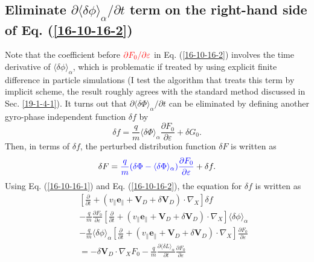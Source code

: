 \documentclass{llncs}
\newcommand{\tmcolor}[2]{{\color{#1}{#2}}}
\begin{document}
\subsection{Eliminate $\partial \langle \delta \phi \rangle_{\alpha} /
\partial t$ term on the right-hand side of Eq. (\ref{16-10-16-2})}

Note that the coefficient before $\tmcolor{red}{\partial F_0 / \partial
\varepsilon}$ in Eq. (\ref{16-10-16-2}) involves the time derivative of
$\langle \delta \phi \rangle_{\alpha}$, which is problematic if treated by
using explicit finite difference in particle simulations (I test the algorithm
that treats this term by implicit scheme, the result roughly agrees with the
standard method discussed in Sec. \ref{19-1-4-1}). It turns out that $\partial
\langle \delta \Phi \rangle_{\alpha} / \partial t$ can be eliminated by
defining another gyro-phase independent function $\delta f$ by
\begin{equation}
  \label{16-10-16-1} \delta f = \frac{q}{m} \langle \delta \Phi
  \rangle_{\alpha} \frac{\partial F_0}{\partial \varepsilon} + \delta G_0 .
\end{equation}
Then, in terms of $\delta f$, the perturbed distribution function $\delta F$
is written as
\begin{equation}
  \label{17-8-19-2} \delta F = \tmcolor{blue}{\frac{q}{m} (\delta \Phi -
  \langle \delta \Phi \rangle_{\alpha}) \frac{\partial F_0}{\partial
  \varepsilon}} + \delta f.
\end{equation}
Using Eq. (\ref{16-10-16-1}) and Eq. (\ref{16-10-16-2}), the equation for
$\delta f$ is written as
\begin{eqnarray}
  &  & \left[ \frac{\partial}{\partial t} + (v_{\parallel}
  \mathbf{e}_{\parallel} +\mathbf{V}_D + \delta \mathbf{V}_D) \cdot \nabla_X
  \right] \delta f \nonumber\\
  &  & - \frac{q}{m}  \frac{\partial F_0}{\partial \varepsilon} \left[
  \frac{\partial}{\partial t} + (v_{\parallel} \mathbf{e}_{\parallel}
  +\mathbf{V}_D + \delta \mathbf{V}_D) \cdot \nabla_X \right] \langle \delta
  \phi \rangle_{\alpha} \nonumber\\
  &  & - \frac{q}{m}  \langle \delta \phi \rangle_{\alpha} \left[
  \frac{\partial}{\partial t} + (v_{\parallel} \mathbf{e}_{\parallel}
  +\mathbf{V}_D + \delta \mathbf{V}_D) \cdot \nabla_X \right] \frac{\partial
  F_0}{\partial \varepsilon} \nonumber\\
  &  & = - \delta \mathbf{V}_D \cdot \nabla_X F_0 - \frac{q}{m} 
  \frac{\partial \langle \delta L \rangle_{\alpha}}{\partial t} 
  \frac{\partial F_0}{\partial \varepsilon} 
\end{eqnarray}
\end{document}
